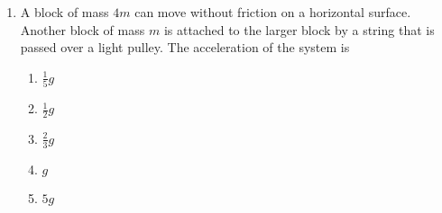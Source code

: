 \documentclass{../../oss-apphys}
\begin{document}
\begin{multicols}{2}
\begin{enumerate}[resume,leftmargin=18pt]
    
    
  \item A block of mass $4m$ can move without friction on a horizontal surface.
    Another block of mass $m$ is attached to the larger block by a string that
    is passed over a light pulley. The acceleration of the system is

    \vspace{-.2in}
    \begin{enumerate}[noitemsep,topsep=0pt,leftmargin=18pt,label=(\Alph*)]
    \item $\displaystyle\frac{1}{5} g$
    \item $\displaystyle\frac{1}{2} g$
    \item $\displaystyle\frac{2}{3} g$
    \item $g$
    \item $5g$
    \end{enumerate}


\end{enumerate}
\end{multicols}
\end{document}
